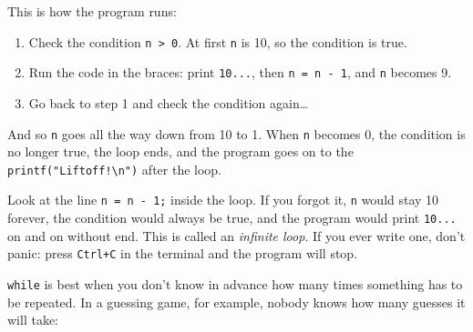 \begin{center}
\end{center}

This is how the program runs:
\begin{enumerate}
  \item Check the condition \texttt{n > 0}. At first \texttt{n} is 10, so the condition is true.
  \item Run the code in the braces: print \texttt{10...}, then \texttt{n = n - 1}, and \texttt{n} becomes 9.
  \item Go back to step 1 and check the condition again\ldots{}
\end{enumerate}
And so \texttt{n} goes all the way down from 10 to 1. When \texttt{n} becomes 0, the condition is no longer true, the loop ends, and the program goes on to the \texttt{printf("Liftoff!\textbackslash n")} after the loop.

Look at the line \texttt{n = n - 1;} inside the loop. If you forgot it, \texttt{n} would stay 10 forever, the condition would always be true, and the program would print \texttt{10...} on and on without end. This is called an \emph{infinite loop}. If you ever write one, don't panic: press \texttt{Ctrl+C} in the terminal and the program will stop.

\texttt{while} is best when you don't know in advance how many times something has to be repeated. In a guessing game, for example, nobody knows how many guesses it will take:

